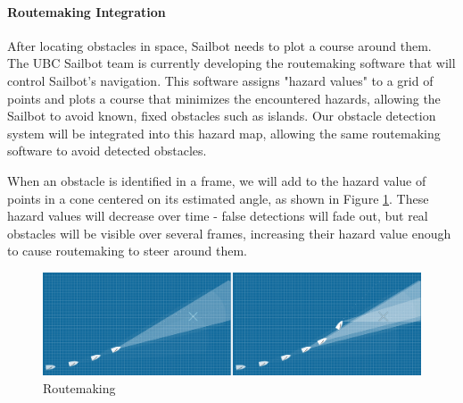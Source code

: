 \paragraph{\label{sec:discussion:equipment:architecture:routemaking}Routemaking Integration}
After locating obstacles in space, Sailbot needs to plot a course around them.  The UBC Sailbot team is currently developing the routemaking software that will control Sailbot's navigation.  This software assigns "hazard values" to a grid of points and plots a course that minimizes the encountered hazards, allowing the Sailbot to avoid known, fixed obstacles such as islands.  Our obstacle detection system will be integrated into this hazard map, allowing the same routemaking software to avoid detected obstacles.

When an obstacle is identified in a frame, we will add to the hazard value of points in a cone centered on its estimated angle, as shown in Figure \ref{fig:routemaking}.  These hazard values will decrease over time - false detections will fade out, but real obstacles will be visible over several frames, increasing their hazard value enough to cause routemaking to steer around them.

\begin{figure}
\includegraphics[width=160mm,natwidth=1203,natheight=627]{"./image/routemaking"}
\caption[UBC Sailbot.]{\label{fig:routemaking}Routemaking}
\end{figure}